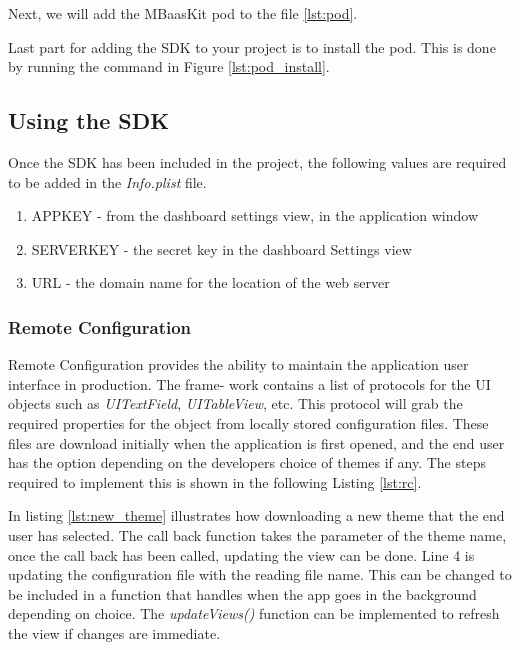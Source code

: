 Next, we will add the MBaasKit pod to the file \ref{lst:pod}.



Last part for adding the SDK to your project is to install the pod. This is done by running the command in Figure \ref{lst:pod_install}.



\subsection{Using the SDK}

Once the SDK has been included in the project, the following values are required to be added in the \textit{Info.plist} file.

\begin{enumerate}
  \item APPKEY - from the dashboard settings view, in the application window
  \item SERVERKEY - the secret key in the dashboard Settings view
  \item URL - the domain name for the location of the web server
\end{enumerate}

\subsubsection{Remote Configuration}

Remote Configuration provides the ability to maintain the application user interface in production. The frame- work contains a list of protocols for the UI objects such as \textit{UITextField}, \textit{UITableView}, etc. This protocol will grab the required properties for the object from locally stored configuration files. These files are download initially when the application is first opened, and the end user has the option depending on the developers choice of themes if any. The steps required to implement this is shown in the following Listing  \ref{lst:rc}.



In listing \ref{lst:new_theme} illustrates how downloading a new theme that the end user has selected. The call back function takes the parameter of the theme name, once the call back has been called, updating the view can be done. Line 4 is updating the configuration file with the reading file name. This can be changed to be included in a function that handles when the app goes in the background depending on choice. The \textit{updateViews()} function can be implemented to refresh the view if changes are immediate.

